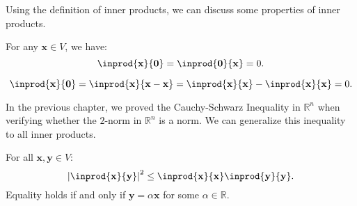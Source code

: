 \documentclass{huhtakm-template-book-v2}
\begin{document}
    Using the definition of inner products, we can discuss some properties of inner products.
    \begin{thm}
        For any $\mathbf{x} \in V$, we have:
        \begin{equation*}
            \inprod{\mathbf{x}}{\mathbf{0}} = \inprod{\mathbf{0}}{\mathbf{x}} = 0.
        \end{equation*}
    \end{thm}
    \begin{proofing}
        \begin{equation*}
            \inprod{\mathbf{x}}{\mathbf{0}} = \inprod{\mathbf{x}}{\mathbf{x} - \mathbf{x}} = \inprod{\mathbf{x}}{\mathbf{x}} - \inprod{\mathbf{x}}{\mathbf{x}} = 0.
        \end{equation*}
    \end{proofing}
    In the previous chapter, we proved the Cauchy-Schwarz Inequality in $\mathbb{R}^{n}$ when verifying whether the $2$-norm in $\mathbb{R}^{n}$ is a norm. We can generalize this inequality to all inner products.
    \begin{thm}
        For all $\mathbf{x}, \mathbf{y} \in V$:
        \begin{equation*}
            \abs{\inprod{\mathbf{x}}{\mathbf{y}}}^{2} \leq \inprod{\mathbf{x}}{\mathbf{x}}\inprod{\mathbf{y}}{\mathbf{y}}.
        \end{equation*}
        Equality holds if and only if $\mathbf{y} = \alpha\mathbf{x}$ for some $\alpha \in \mathbb{R}$.
    \end{thm}
\end{document}

